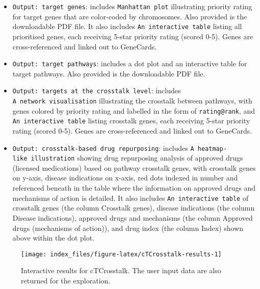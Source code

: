 \documentclass[
  oneside]{book}
\begin{document}
\begin{itemize}
\item
  \texttt{Output:\ target\ genes}: includes \texttt{Manhattan\ plot} illustrating priority rating for target genes that are color-coded by chromosomes. Also provided is the downloadable PDF file. It also includes \texttt{An\ interactive\ table} listing all prioritised genes, each receiving 5-star priority rating (scored 0-5). Genes are cross-referenced and linked out to GeneCards.
\item
  \texttt{Output:\ target\ pathways}: includes a dot plot and an interactive table for target pathways. Also provided is the downloadable PDF file.
\item
  \texttt{Output:\ targets\ at\ the\ crosstalk\ level}: includes \texttt{A\ network\ visualisation} illustrating the crosstalk between pathways, with genes colored by priority rating and labelled in the form of \texttt{rating@rank}, and \texttt{An\ interactive\ table}
  listing crosstalk genes, each receiving 5-star priority rating (scored 0-5). Genes are cross-referenced and linked out to GeneCards.
\item
  \texttt{Output:\ crosstalk-based\ drug\ repurposing}: includes \texttt{A\ heatmap-like\ illustration} showing drug repurposing analysis of approved drugs (licensed medications) based on pathway crosstalk genes, with crosstalk genes on y-axis, disease indications on x-axis, red dots indexed in number and referenced beneath in the table where the information on approved drugs and mechanisms of action is detailed. It also includes \texttt{An\ interactive\ table} of crosstalk genes (the column Crosstalk genes), disease indications (the column Disease indications), approved drugs and mechanisms (the column Approved drugs (mechanisms of action)), and drug index (the column Index) shown above within the dot plot.
\end{itemize}

\begin{figure}

{\centering \texttt{[image: index\_files/figure-latex/cTCrosstalk-results-1]} 

}

\caption{Interactive results for cTCrosstalk. The user input data are also returned for the exploration.}\label{fig:cTCrosstalk-results}
\end{figure}
\end{document}
